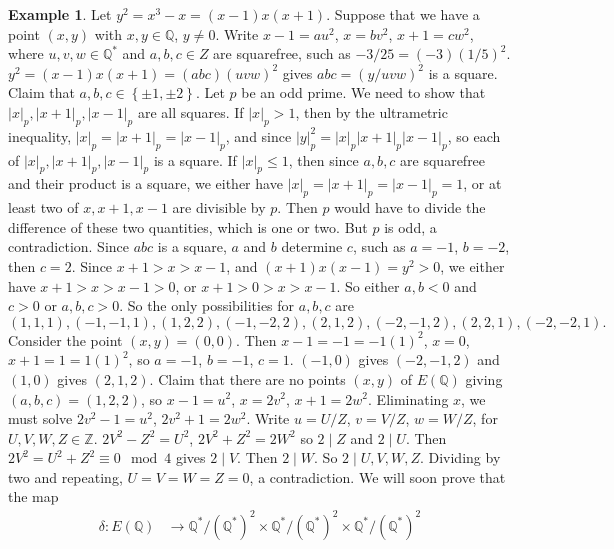 \documentclass{article}
\newcommand{\Z}{\mathbb{Z}}
\newcommand{\Q}{\mathbb{Q}}
\newcommand{\rb}[1]{\left( #1 \right)}
\newcommand{\cb}[1]{\left\{ #1 \right\}}
\newcommand{\abs}[1]{\left\lvert #1 \right\rvert}
\theoremstyle{definition}\newtheorem{definition}{Definition}[section]
\theoremstyle{definition}\newtheorem{remark}[definition]{Remark}
\theoremstyle{definition}\newtheorem*{example}{Example}
\theoremstyle{definition}\newtheorem*{note}{Note}
\begin{document}
\begin{example}
Let $ y^2 = x^3 - x = \rb{x - 1}x\rb{x + 1} $. Suppose that we have a point $ \rb{x, y} $ with $ x, y \in \Q $, $ y \ne 0 $. Write $ x - 1 = au^2 $, $ x = bv^2 $, $ x + 1 = cw^2 $, where $ u, v, w \in \Q^* $ and $ a, b, c \in Z $ are squarefree, such as $ -3 / 25 = \rb{-3}\rb{1 / 5}^2 $. $ y^2 = \rb{x - 1}x\rb{x + 1} = \rb{abc}\rb{uvw}^2 $ gives $ abc = \rb{y / uvw}^2 $ is a square. Claim that $ a, b, c \in \cb{\pm 1, \pm 2} $. Let $ p $ be an odd prime. We need to show that $ \abs{x}_p, \abs{x + 1}_p, \abs{x - 1}_p $ are all squares. If $ \abs{x}_p > 1 $, then by the ultrametric inequality, $ \abs{x}_p = \abs{x + 1}_p = \abs{x - 1}_p $, and since $ \abs{y}_p^2 = \abs{x}_p\abs{x + 1}_p\abs{x - 1}_p $, so each of $ \abs{x}_p, \abs{x + 1}_p, \abs{x - 1}_p $ is a square. If $ \abs{x}_p \le 1 $, then since $ a, b, c $ are squarefree and their product is a square, we either have $ \abs{x}_p = \abs{x + 1}_p = \abs{x - 1}_p = 1 $, or at least two of $ x, x + 1, x - 1 $ are divisible by $ p $. Then $ p $ would have to divide the difference of these two quantities, which is one or two. But $ p $ is odd, a contradiction. Since $ abc $ is a square, $ a $ and $ b $ determine $ c $, such as $ a = -1 $, $ b = -2 $, then $ c = 2 $. Since $ x + 1 > x > x - 1 $, and $ \rb{x + 1}x\rb{x - 1} = y^2 > 0 $, we either have $ x + 1 > x > x - 1 > 0 $, or $ x + 1 > 0 > x > x - 1 $. So either $ a, b < 0 $ and $ c > 0 $ or $ a, b, c > 0 $. So the only possibilities for $ a, b, c $ are
$$ \rb{1, 1, 1}, \rb{-1, -1, 1}, \rb{1, 2, 2}, \rb{-1, -2, 2}, \rb{2, 1, 2}, \rb{-2, -1, 2}, \rb{2, 2, 1}, \rb{-2, -2, 1}. $$
Consider the point $ \rb{x, y} = \rb{0, 0} $. Then $ x - 1 = -1 = -1\rb{1}^2 $, $ x = 0 $, $ x + 1 = 1 = 1\rb{1}^2 $, so $ a = -1 $, $ b = -1 $, $ c = 1 $. $ \rb{-1, 0} $ gives $ \rb{-2, -1, 2} $ and $ \rb{1, 0} $ gives $ \rb{2, 1, 2} $. Claim that there are no points $ \rb{x, y} $ of $ E\rb{\Q} $ giving $ \rb{a, b, c} = \rb{1, 2, 2} $, so $ x - 1 = u^2 $, $ x = 2v^2 $, $ x + 1 = 2w^2 $. Eliminating $ x $, we must solve $ 2v^2 - 1 = u^2 $, $ 2v^2 + 1 = 2w^2 $. Write $ u = U / Z $, $ v = V / Z $, $ w = W / Z $, for $ U, V, W, Z \in \Z $. $ 2V^2 - Z^2 = U^2 $, $ 2V^2 + Z^2 = 2W^2 $ so $ 2 \mid Z $ and $ 2 \mid U $. Then $ 2V^2 = U^2 + Z^2 \equiv 0 \mod 4 $ gives $ 2 \mid V $. Then $ 2 \mid W $. So $ 2 \mid U, V, W, Z $. Dividing by two and repeating, $ U = V = W = Z = 0 $, a contradiction. We will soon prove that the map
\begin{align*}
\delta : E\rb{\Q} & \to \Q^* / \rb{\Q^*}^2 \times \Q^* / \rb{\Q^*}^2 \times \Q^* / \rb{\Q^*}^2 \\

\end{align*}
\end{example}
\end{document}
